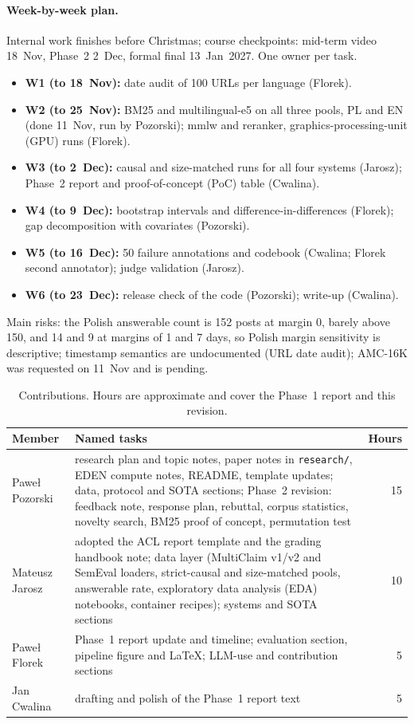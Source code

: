 \documentclass[11pt]{article}
\begin{document}
\paragraph{Week-by-week plan.}
Internal work finishes before Christmas; course checkpoints: mid-term video 18~Nov, Phase~2 2~Dec, formal final 13~Jan~2027. One owner per task.
\begin{itemize}
\setlength\itemsep{0pt}
\item \textbf{W1 (to 18~Nov):} date audit of 100 URLs per language (Florek).
\item \textbf{W2 (to 25~Nov):} BM25 and multilingual-e5 on all three pools, PL and EN (done 11~Nov, run by Pozorski); mmlw and reranker, graphics-processing-unit (GPU) runs (Florek).
\item \textbf{W3 (to 2~Dec):} causal and size-matched runs for all four systems (Jarosz); Phase~2 report and proof-of-concept (PoC) table (Cwalina).
\item \textbf{W4 (to 9~Dec):} bootstrap intervals and difference-in-differences (Florek); gap decomposition with covariates (Pozorski).
\item \textbf{W5 (to 16~Dec):} 50 failure annotations and codebook (Cwalina; Florek second annotator); judge validation (Jarosz).
\item \textbf{W6 (to 23~Dec):} release check of the code (Pozorski); write-up (Cwalina).
\end{itemize}
Main risks: the Polish answerable count is 152 posts at margin 0, barely above 150, and 14 and 9 at margins of 1 and 7 days, so Polish margin sensitivity is descriptive; timestamp semantics are undocumented (URL date audit); AMC-16K was requested on 11~Nov and is pending.

\begin{table}[!t]
\centering
\caption{Contributions. Hours are approximate and cover the Phase~1 report and this revision.}
\label{tab:contrib}
\small
\setlength{\tabcolsep}{4pt}
\begin{tabular}{@{}lp{11.5cm}r@{}}
\toprule
Member & Named tasks & Hours \\
\midrule
Pawe{\l} Pozorski & research plan and topic notes, paper notes in \texttt{research/}, EDEN compute notes, README, template updates; data, protocol and SOTA sections; Phase~2 revision: feedback note, response plan, rebuttal, corpus statistics, novelty search, BM25 proof of concept, permutation test & 15 \\
Mateusz Jarosz & adopted the ACL report template and the grading handbook note; data layer (MultiClaim v1/v2 and SemEval loaders, strict-causal and size-matched pools, answerable rate, exploratory data analysis (EDA) notebooks, container recipes); systems and SOTA sections & 10 \\
Pawe{\l} Florek & Phase~1 report update and timeline; evaluation section, pipeline figure and LaTeX; LLM-use and contribution sections & 5 \\
Jan Cwalina & drafting and polish of the Phase~1 report text & 5 \\
\bottomrule
\end{tabular}
\end{table}
\end{document}
